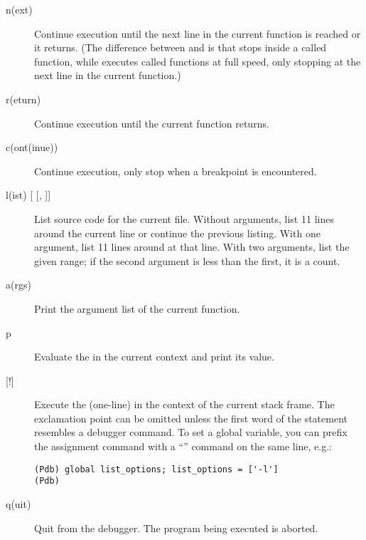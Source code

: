 \begin{description}
\item[{n(ext)}]

Continue execution until the next line in the current function
is reached or it returns.  (The difference between  and
 is that  stops inside a called function, while
 executes called functions at full speed, only stopping at
the next line in the current function.)

\item[{r(eturn)}]

Continue execution until the current function returns.

\item[{c(ont(inue))}]

Continue execution, only stop when a breakpoint is encountered.

\item[{l(ist) [ [, ]]}]

List source code for the current file.
Without arguments, list 11 lines around the current line
or continue the previous listing.
With one argument, list 11 lines around at that line.
With two arguments, list the given range;
if the second argument is less than the first, it is a count.

\item[{a(rgs)}]

Print the argument list of the current function.

\item[{p }]

Evaluate the  in the current context and print its
value.

\item[{[!] }]

Execute the (one-line)  in the context of
the current stack frame.
The exclamation point can be omitted unless the first word
of the statement resembles a debugger command.
To set a global variable, you can prefix the assignment
command with a ``'' command on the same line, e.g.:
\begin{verbatim}
(Pdb) global list_options; list_options = ['-l']
(Pdb)
\end{verbatim}

\item[{q(uit)}]

Quit from the debugger.
The program being executed is aborted.

\end{description}
